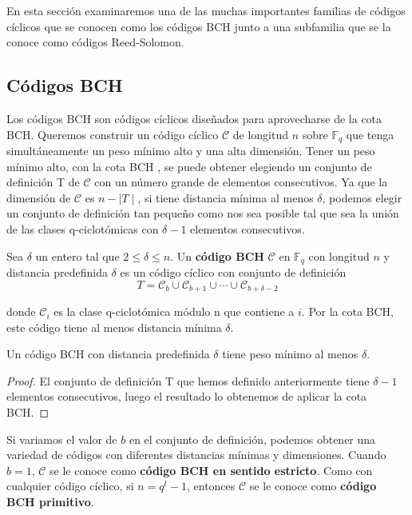 En esta sección examinaremos una de las muchas importantes familias de códigos cíclicos que se conocen como los códigos BCH junto a una subfamilia que se la conoce como códigos Reed-Solomon.

\subsection{Códigos BCH}

Los códigos BCH son códigos cíclicos diseñados para aprovecharse de la cota BCH. Queremos construir un código cíclico $\mathcal{C}$ de longitud $n$ sobre $\mathbb{F}_q$ que tenga simultáneamente un peso mínimo alto y una alta dimensión. Tener un peso mínimo alto, con la cota BCH , se puede obtener elegiendo un conjunto de definición T de $\mathcal{C}$ con un número grande de elementos consecutivos. Ya que la dimensión de $\mathcal{C}$ es $n - \mid T \mid$, si tiene distancia mínima al menos $\delta$, podemos elegir un conjunto de definición tan pequeño como nos sea posible tal que sea la unión de las clases q-ciclotómicas con $\delta -1$ elementos consecutivos. 


\begin{definition}
Sea $\delta$ un entero tal que $ 2 \leq \delta \leq n$. Un \textbf{código BCH} $\mathcal{C}$ en $\mathbb{F}_q$ con longitud $n$ y distancia predefinida $\delta$ es un código cíclico con conjunto de definición 
\[
T = \mathcal{C}_b \cup \mathcal{C}_{b+1} \cup \cdots \cup \mathcal{C}_{b+\delta -2}
\]

donde $\mathcal{C}_i$ es la clase q-ciclotómica módulo n que contiene a $i$. Por la cota BCH, este código tiene al menos distancia mínima $\delta$.
\end{definition}


\begin{theorem}
\label{th:bch_dist_min}
Un código BCH con distancia predefinida $\delta$ tiene peso mínimo al menos $\delta$.
\end{theorem}
\begin{proof}
El conjunto de definición T que hemos definido anteriormente tiene $\delta -1$ elementos consecutivos, luego el resultado lo obtenemos de aplicar la cota BCH.
\end{proof}

Si variamos el valor de $b$ en el conjunto de definición, podemos obtener una variedad de códigos con diferentes distancias mínimas y dimensiones. Cuando $b=1$, $\mathcal{C}$ se le conoce como \textbf{código BCH en sentido estricto}. Como con cualquier código cíclico, si $n = q^t-1$, entonces $\mathcal{C}$ se le conoce como \textbf{código BCH primitivo}.

